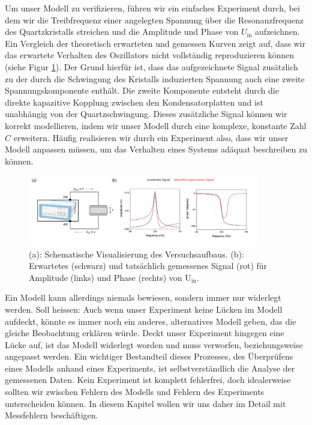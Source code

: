 Um unser Modell zu verifizieren, führen wir ein einfaches Experiment durch, bei dem wir die Treibfrequenz einer angelegten Spannung über die Resonanzfrequenz des Quartzkristalls streichen und die Amplitude und Phase von $U_{\mathrm{in}}$ aufzeichnen. Ein Vergleich der theoretisch erwarteten und gemessen Kurven zeigt auf, dass wir das erwartete Verhalten des Oszillators nicht vollständig reproduzieren können (siehe Figur \ref{fig:oszillator}). Der Grund hierfür ist, dass  das aufgezeichnete Signal zusätzlich zu der durch die Schwingung des Kristalls induzierten Spannung auch eine zweite Spannungskomponente enthält. Die zweite Komponente entsteht durch die direkte kapazitive Kopplung zwischen den Kondensatorplatten und ist unabhängig von der Quartzschwingung. Dieses zusätzliche Signal können wir korrekt modellieren, indem wir unser Modell durch eine komplexe, konstante Zahl $C$ erweitern. Häufig realisieren wir durch ein Experiment also, dass wir unser Modell anpassen müssen, um das Verhalten eines Systems adäquat beschreiben zu können.  

\begin{figure}[H]
\centering
\includegraphics[width=0.9\textwidth]{Figures/modellundexperiment.pdf}
\caption{(a): Schematische Visualisierung des Versuchsaufbaus. (b): Erwartetes (schwarz) und tatsächlich gemessenes Signal (rot) für Amplitude (links) und Phase (rechts) von U$_{\mathrm{in}}$. }
\label{fig:oszillator}
\end{figure}

 Ein Modell kann allerdings niemals bewiesen, sondern immer nur widerlegt werden. Soll heissen: Auch wenn unser Experiment keine Lücken im Modell aufdeckt, könnte es immer noch ein anderes, alternatives Modell geben, das die gleiche Beobachtung erklären würde. Deckt unser Experiment hingegen eine Lücke auf, ist das Modell widerlegt worden und muss verworfen, beziehungsweise angepasst werden. Ein wichtiger Bestandteil dieses Prozesses, des Überprüfens eines Modells anhand eines Experiments, ist selbstverständlich die Analyse der gemessenen Daten. Kein Experiment ist komplett fehlerfrei, doch idealerweise sollten wir zwischen Fehlern des Modells und Fehlern des Experiments unterscheiden können. In diesem Kapitel wollen wir uns daher im Detail mit Messfehlern beschäftigen. 

